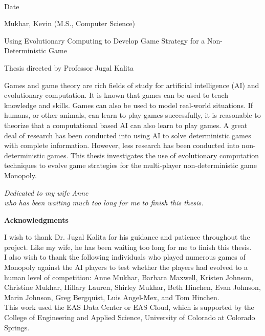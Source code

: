 \begin{flushright}
	\vspace{2.0pc}
	\makebox[2in]{\hrulefill} \\[-1.0pc]
	Date
\end{flushright}


\newpage

\setlength{\parindent}{0in}
Mukhar, Kevin (M.S., Computer Science) 

Using Evolutionary Computing to
Develop Game Strategy for a Non-Deterministic Game 

Thesis directed by Professor Jugal Kalita

\vspace{28pt}
\setlength{\parindent}{.4in}

Games and game theory are rich fields of study for artificial intelligence (AI)
and evolutionary computation. It is known that games can be used to teach
knowledge and skills. Games can also be used to model real-world situations. If
humans, or other animals, can learn to play games successfully, it is
reasonable to theorize that a computational based AI can also learn to play
games. A great deal of research has been conducted into using AI to solve
deterministic games with complete information. However, less research has
been conducted into non-deterministic games. This thesis investigates the use of
evolutionary computation techniques to evolve game strategies for the
multi-player non-deterministic game Monopoly.

\newpage

\parbox{5.0in}{
	\vspace{2.0in}
	\begin{center}
		{\large{\emph{Dedicated to my wife Anne\\ who has been waiting much
		too long for me to finish this thesis.}}}
	\end{center}
}


\newpage
\begin{center}
	{\large{\bf Acknowledgments}}
\end{center}
\setlength{\parindent}{.4in}

I wish to thank Dr. Jugal Kalita for his guidance and patience throughout the
project. Like my wife, he has been waiting too long for me to finish this
thesis. \\

I also wish to thank the following individuals who played numerous games
of Monopoly against the AI players to test whether the players had evolved to a
human level of competition: Anne Mukhar, Barbara Maxwell, Kristen Johnson,
Christine Mukhar, Hillary Lauren, Shirley Mukhar, Beth Hinchen, Evan Johnson,
Marin Johnson, Greg Bergquist, Luis Angel-Mex, and Tom Hinchen.\\

This work used the EAS Data Center or EAS Cloud, which is supported by the
College of Engineering and Applied Science, University of Colorado at Colorado
Springs.
